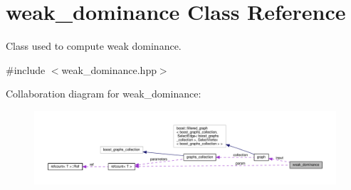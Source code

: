 \hypertarget{classweak__dominance}{}\section{weak\+\_\+dominance Class Reference}
\label{classweak__dominance}


Class used to compute weak dominance.  




{\ttfamily \#include $<$weak\+\_\+dominance.\+hpp$>$}



Collaboration diagram for weak\+\_\+dominance\+:
\nopagebreak
\begin{figure}[H]
\begin{center}
\leavevmode
\includegraphics[width=350pt]{d0/db0/classweak__dominance__coll__graph}
\end{center}
\end{figure}
